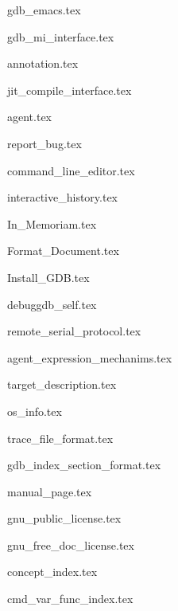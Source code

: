 \documentclass[12pt,twoside,a4paper,openright]{book}
\begin{document}
\begin{CJK}{UTF8}{gbsn}
{gdb_emacs.tex}

{gdb_mi_interface.tex}

{annotation.tex}

{jit_compile_interface.tex}

{agent.tex}

{report_bug.tex}

{command_line_editor.tex}

{interactive_history.tex}

\appendix


{In_Memoriam.tex}

{Format_Document.tex}

{Install_GDB.tex}

{debuggdb_self.tex}

{remote_serial_protocol.tex}

{agent_expression_mechanims.tex}

{target_description.tex}

{os_info.tex}

{trace_file_format.tex}

{gdb_index_section_format.tex}

{manual_page.tex}

{gnu_public_license.tex}

{gnu_free_doc_license.tex}

\titleformat{\chapter}[block]{\bfseries\huge}{}{0em}{}

{concept_index.tex}

{cmd_var_func_index.tex}

\cleardoublepage
\end{CJK}
\end{document}

